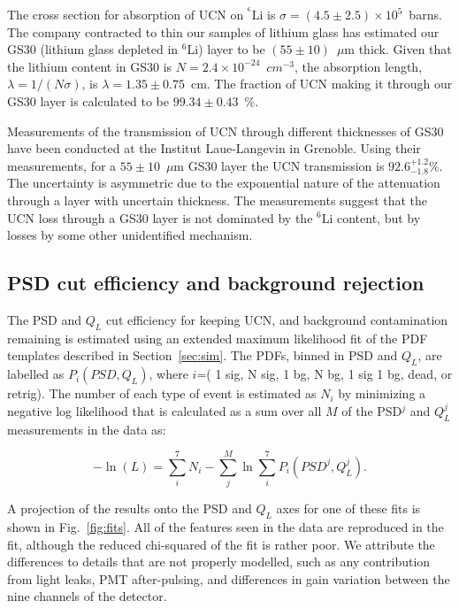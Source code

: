 \documentclass[review]{elsarticle}
\begin{document}
The cross section for absorption of UCN on $^{^6}$Li is $\sigma =
(4.5\pm2.5)\times10^{5}$~barns\cite{ban}.  The company contracted to
thin our samples of lithium glass has estimated our GS30 (lithium
glass depleted in $^6$Li) layer to be $(55\pm10)$~$\mu$m thick.  Given
that the lithium content in GS30 is $N = 2.4\times10^{-24}$~$cm^{-3}$,
the absorption length, $\lambda=1/(N\sigma)$, is
$\lambda=1.35\pm0.75$~cm.  The fraction of UCN making it through our
GS30 layer is calculated to be $99.34\pm0.43$~\%.

Measurements of the transmission of UCN through different thicknesses
of GS30 have been conducted at the Institut Laue-Langevin in
Grenoble\cite{Senoville}.  Using their measurements, for a
$55\pm10$~$\mu$m GS30 layer the UCN transmission is
$92.6^{+1.2}_{-1.8}$\%. The uncertainty is asymmetric due to the
exponential nature of the attenuation through a layer with uncertain
thickness.  The measurements suggest that the UCN loss through a GS30
layer is not dominated by the $^{6}$Li content, but by losses by some
other unidentified mechanism.

\subsection{ PSD cut efficiency and background rejection}

The PSD and $Q_L$ cut efficiency for keeping UCN, and background
contamination remaining is estimated using an extended maximum
likelihood fit of the PDF templates described in
Section~\ref{sec:sim}.  The PDFs, binned in PSD and $Q_L$, are
labelled as $P_{i}( PSD, Q_L )$, where $i$=( 1 sig, N sig, 1 bg, N bg,
1 sig 1 bg, dead, or retrig).  The number of each type of event is
estimated as $N_i$ by minimizing a negative log likelihood that is
calculated as a sum over all $M$ of the PSD$^j$ and $Q_L^j$
measurements in the data as:

\begin{equation}
-\ln{(L)} = \sum_{i}^{7} N_i - \sum_{j}^{M} \ln{ \sum_{i}^{7} P_i( PSD^j, Q_L^j) }.
\end{equation}

A projection of the results onto the PSD and $Q_L$ axes for one of
these fits is shown in Fig.~\ref{fig:fits}.  All of the features seen
in the data are reproduced in the fit, although the reduced
chi-squared of the fit is rather poor.  We attribute the differences
to details that are not properly modelled, such as any contribution
from light leaks, PMT after-pulsing, and differences in gain variation
between the nine channels of the detector.
\end{document}
